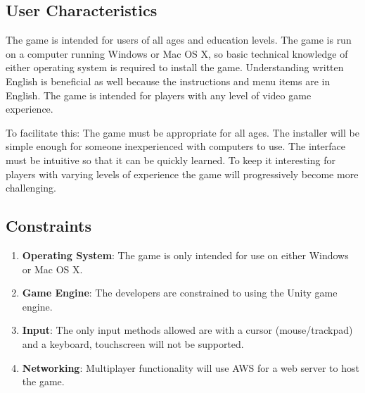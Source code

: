 \documentclass[]{article}
\begin{document}
\subsection{User Characteristics}
\label{sub:user_characteristics}

	
	The game is intended for users of all ages and education levels. The game is run on a computer running Windows or Mac OS X, so basic technical knowledge of either operating system is required to install the game. Understanding written English is beneficial as well because the instructions and menu items are in English. The game is intended for players with any level of video game experience.
	
	To facilitate this: The game must be appropriate for all ages. The installer will be simple enough for someone inexperienced with computers to use. The interface must be intuitive so that it can be quickly learned. To keep it interesting for players with varying levels of experience the game will progressively become more challenging.


\subsection{Constraints}
\label{sub:constraints}
\begin{enumerate}

    \item \textbf{Operating System}: The game is only intended for use on either Windows or Mac OS X.
	\item \textbf{Game Engine}: The developers are constrained to using the Unity game engine. 
	\item \textbf{Input}: The only input methods allowed are with a cursor (mouse/trackpad) and a keyboard, touchscreen will not be supported. 
	\item \textbf{Networking}: Multiplayer functionality will use AWS for a web server to host the game.

	
	
\end{enumerate}
\end{document}
